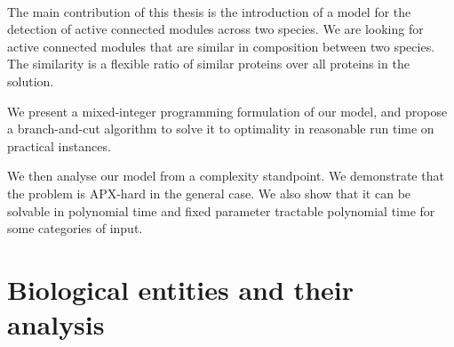 \paragraph{}

The main contribution of this thesis is the introduction of a model for the detection of active connected modules across two species.
We are looking for active connected modules that are similar in composition between two species.
The similarity is a flexible ratio of similar proteins over all proteins in the solution.

We present a mixed-integer programming formulation of our model, and propose a branch-and-cut algorithm to solve it to optimality in reasonable run time on practical instances.

We then analyse our model from a complexity standpoint.
We demonstrate that the problem is APX-hard in the general case.
We also show that it can be solvable in polynomial time and fixed parameter tractable polynomial time for some categories of input.

\section{Biological entities and their analysis}

